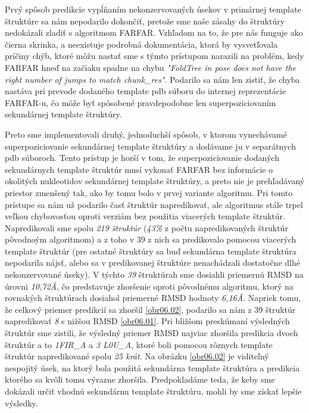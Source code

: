 \indent Prvý spôsob predikcie vypĺňaním nekonzervovaných úsekov v primárnej template štruktúre sa nám nepodarilo dokončiť, pretože sme naše zásahy do štruktúry nedokázali zladiť s algoritmom FARFAR. Vzhľadom na to, že pre nás funguje ako čierna skrinka, a neexistuje podrobná dokumentácia, ktorá by vysvetľovala príčiny chýb, ktoré môžu nastať sme s týmto prístupom narazili na problém, kedy FARFAR hneď na začiaku spadne na chybu \textit{"FoldTree in pose does not have the right number of jumps to match chunk\_res"}. Podarilo sa nám len zistiť, že chyba nastáva pri prevode dodaného template pdb súboru do internej reprezentácie FARFAR-u, čo môže byť spôsobené pravdepodobne len superpoziciovaním sekundárnej template štruktúry.


\indent Preto sme implementovali druhý, jednoduchší spôsob, v ktorom vynechávamé superpoziciovanie sekundárnej template štruktúry a dodávame ju v separátnych pdb súboroch. Tento prístup je horší v tom, že superpoziciovanie dodaných sekundárnych template štruktúr musí vykonať FARFAR bez informácie o okolitých nukleotidov sekundárnej template štruktúry, a preto nie je prehľadávaný priestor zmenšený tak, ako by tomu bolo v prvej variante algoritmu. Pri tomto prístupe sa nám už podarilo časť štruktúr napredikovať, ale algoritmus stále trpel veľkou chybovosťou oproti verziám bez použitia viacerých template štruktúr. Napredikovali sme spolu \textit{219 štruktúr} (\textit{43\%} z počtu napredikovaných štruktúr pôvodnoým algoritmom) a z toho v 39 z nich sa predikovalo pomocou viacerých template štruktúr (pre ostatné štruktúry sa buď sekundárna template štruktúra nepodarila nájsť, alebo sa v predikovanej štruktúre nenachádzali dostatočne dlhé nekonzervované úseky). V týchto \textit{39} štruktúrah sme dosiahli priemernú RMSD na úrovni \textit{10,72Å}, čo predstavuje zhoršenie oproti pôvodnému algoritmu, ktorý na rovnakých štruktúrach dosiahol priemerné RMSD hodnoty \textit{6,16Å}. Napriek tomu, že celkový priemer predikcií sa zhoršil \autoref{obr06.02}, podarilo sa nám z 39 štruktúr napredikovať \textit{8}  s nižšou RMSD \autoref{obr06.01}.
Pri bližšom preskúmaní výsledných štruktúr sme zistili, že výsledný priemer RMSD najviac zhoršila predikcia dvoch štruktúr a to \textit{1FIR\_A} a \textit{3 L0U\_A}, ktoré boli pomocou rôznych template štruktúr napredikované spolu \textit{25 krát}. Na obrázku \autoref{obr06.02} je viditeľný nespojitý úsek, na ktorý bola použitá sekundárna template štruktúra a predikcia ktorého sa kvôli tomu výrazne zhoršila. Predpokladáme teda, že keby sme dokázali určiť vhodnú sekundárnu template štruktúru, mohli by sme získať lepšie výsledky.

